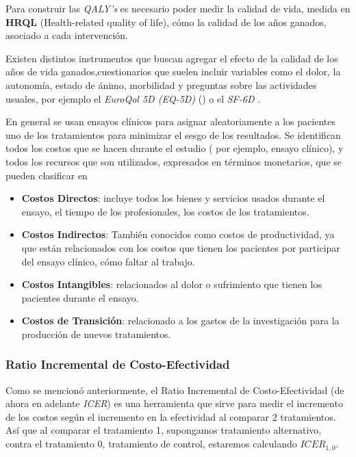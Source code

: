 \documentclass{siep}
\begin{document}
Para construir las \textit{QALY's} es necesario poder medir la calidad de vida, medida en \textbf{HRQL} (Health-related quality of life), cómo la calidad de los años ganados, asociado a cada intervención. 

Existen distintos instrumentos que buscan agregar el efecto de la calidad de los años de vida ganados,cuestionarios que suelen incluir variables como el dolor, la autonomía, estado de ánimo, morbilidad y preguntas sobre las actividades usuales, por ejemplo el \textit{EuroQol 5D (EQ-5D)} (\cite{baio_bayesian_nodate}) o el \textit{SF-6D }.


En general se usan ensayos clínicos  para asignar aleatoriamente  a los pacientes  uno de los tratamientos para minimizar el sesgo de los resultados. Se identifican todos los costos que se hacen durante  el estudio ( por ejemplo, ensayo clínico), y todos los recursos que son utilizados, expresados en términos monetarios, que se pueden  clasificar en  

\begin{itemize}
	\item \textbf{Costos Directos}: incluye todos los bienes y servicios usados durante el ensayo, el tiempo de los profesionales, los costos de los tratamientos.
	
	\item \textbf{Costos Indirectos}: También conocidos como costos de productividad, ya que están relacionados con los costos que tienen los pacientes por participar del ensayo clínico, cómo faltar al trabajo.
	
	\item \textbf{Costos Intangibles}: relacionados al dolor o sufrimiento que tienen los pacientes durante el ensayo.
	
	\item \textbf{Costos de Transición}: relacionado a los gastos de la investigación para la producción de nuevos tratamientos.
\end{itemize}

\subsubsection{Ratio Incremental de Costo-Efectividad}
\label{sec:RCICE}
Como se mencionó anteriormente, el Ratio Incremental de Costo-Efectividad (de ahora en adelante \textit{ICER}) es una herramienta que sirve para medir el incremento de los costos según el incremento en la efectividad al comparar 2 tratamientos. Así que al comparar el tratamiento 1, supongamos tratamiento alternativo, contra el tratamiento 0, tratamiento de control, estaremos calculando $ICER_{1,0}$.
\end{document}
